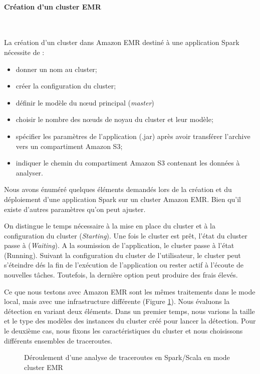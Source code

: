 \paragraph{Création d'un cluster EMR}~

La création d'un cluster dans Amazon EMR destiné à une application Spark nécessite de  :
\begin{itemize}
	\item donner un nom au cluster;
	\item créer la configuration du cluster;
	\item définir le modèle du n\oe{}ud principal (\textit{master}) 
	\item choisir le nombre des n\oe{}uds de noyau  du cluster et leur modèle;
	\item spécifier les paramètres de l'application  (.jar) après avoir transférer l'archive vers  un compartiment Amazon S3;
	\item indiquer le chemin du compartiment Amazon S3 contenant  les données à analyser.
\end{itemize}

Nous avons énuméré quelques éléments demandés lors de la création et du déploiement d'une application Spark sur un cluster Amazon EMR. Bien  qu'il existe d'autres paramètres qu'on peut ajuster. 

On distingue le temps nécessaire à la mise en place du cluster et à la configuration du cluster (\textit{Starting}). Une fois le cluster est prêt, l'état du cluster passe à (\textit{Waiting}).  A la soumission de l'application, le cluster passe à l'état (Running). Suivant la configuration du cluster de l'utilisateur, le cluster peut s'éteindre dés la fin de l'exécution de l'application ou rester actif à l'écoute de nouvelles tâches. Toutefois, la dernière option peut produire des frais élevés.  


Ce que nous testons avec Amazon EMR sont les mêmes traitements dans le mode local, mais avec une infrastructure différente (Figure \ref{fig:sparktimingEMR}). Nous évaluons la détection en variant deux éléments. Dans un premier temps, nous varions la taille et le type des modèles des instances du cluster créé pour lancer la détection. Pour le deuxième cas, nous fixons les caractéristiques du cluster et  nous choisissons différents ensembles de traceroutes. 


\begin{figure}[H]
	\centering
	\captionsetup{justification=centering}
	\resizebox{\textwidth}{!}{
		
	}
	\caption{Déroulement d'une analyse de  traceroutes en Spark/Scala en mode cluster EMR}
	\label{fig:sparktimingEMR}
\end{figure}


